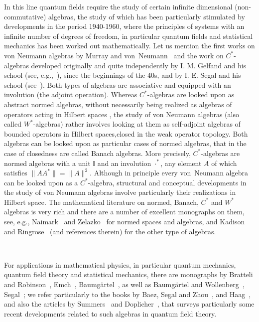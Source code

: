\documentclass{article}
\newcommand{\asterisk}{\mathord{*}}
\begin{document}
In this line quantum fields require the study of certain infinite dimensional
(non-commutative) algebras, the study of which has been particularly
stimulated by developments in the period 1940-1960, where the principles of
systems with an infinite number of degrees of freedom, in particular quantum
fields and statistical mechanics has been worked out mathematically. Let us
mention the first works on von Neumann algebras by Murray and
von~Neumann~{\cite{Murray1,Murray2,Murray3,VonNeumann}} and the work on
$C^{\asterisk}$-algebras developed originally and quite independently by I. M.
Gelfand and his school (see, e.g.,~{\cite{Gelfand}}), since the beginnings of
the 40s, and by I. E. Segal and his school (see~{\cite{Segal1,Segalbook}}).
Both types of algebras are associative and equipped with an involution (the
adjoint operation). Whereas $C^{\ast}$-algebras are looked upon as abstract
normed algebras, without necessarily being realized as algebras of operators
acting in Hilbert spaces , the study of von Neumann algebras (also called
$W^{\ast}$-algebras) rather involves looking at them as self-adjoint algebras
of bounded operators in Hilbert spaces,closed in the weak operator topology.
Both algebras can be looked upon as particular cases of normed algebras, that
in the case of closedness are called Banach algebras. More precisely,
$C^{\ast}$-algebras are normed algebras with a unit $\mathbb{I}$ and an
involution $\cdot^{\ast}$, any element $A$ of which satisfies $\| A A^{\ast}
\| = \| A \|^2$. Although in principle every von~Neumann algebra can be looked
upon as a $C^{\ast}$-algebra, structural and conceptual developments in the
study of von Neumann algebras involve particularly their realizations in
Hilbert space. The mathematical literature on normed, Banach, $C^{\ast}$ and
$W^{\ast}$ algebras is very rich and there are a number of excellent
monographs on them, see, e.g., Naimark~{\cite{Naimark}} and
Zelazko~{\cite{MR0448079}} for normed spaces and algebras, and Kadison and
Ringrose~{\cite{Kadison1,Kadison2}} (and references therein) for the other
type of algebras.

\

For applications in mathematical physics, in particular quantum mechanics,
quantum field theory and statistical mechanics, there are monographs by
Bratteli and Robinson~{\cite{Bratteli1,Bratteli2}}, Emch~{\cite{Emch}},
Baumg{\"a}rtel~{\cite{Baumgartel1}}, as well as Baumg{\"a}rtel and
Wollenberg~{\cite{Baumgartel2}}, Segal~{\cite{Segalbook2}}; we refer
particularly to the books by Baez, Segal and Zhou~{\cite{Segalbook}}, and
Haag~{\cite{Haag1}}, and also the articles by
Summers~{\cite{summers2012perspective}} and Doplicher~{\cite{Doplicher}}, that
surveys particularly some recent developments related to such algebras in
quantum field theory.
\end{document}
